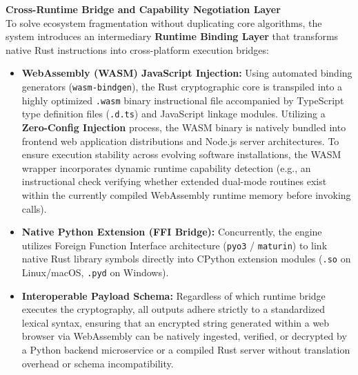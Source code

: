 \documentclass[12pt, a4paper]{article}
\begin{document}
\vspace{0.5em}
\noindent \textbf{Cross-Runtime Bridge and Capability Negotiation Layer} \\
To solve ecosystem fragmentation without duplicating core algorithms, the system introduces an intermediary \textbf{Runtime Binding Layer} that transforms native Rust instructions into cross-platform execution bridges:
\begin{itemize}
    \item \textbf{WebAssembly (WASM) JavaScript Injection:} Using automated binding generators (\texttt{wasm-bindgen}), the Rust cryptographic core is transpiled into a highly optimized \texttt{.wasm} binary instructional file accompanied by TypeScript type definition files (\texttt{.d.ts}) and JavaScript linkage modules. Utilizing a \textbf{Zero-Config Injection} process, the WASM binary is natively bundled into frontend web application distributions and Node.js server architectures. To ensure execution stability across evolving software installations, the WASM wrapper incorporates dynamic runtime capability detection (e.g., an instructional check verifying whether extended dual-mode routines exist within the currently compiled WebAssembly runtime memory before invoking calls).
    \item \textbf{Native Python Extension (FFI Bridge):} Concurrently, the engine utilizes Foreign Function Interface architecture (\texttt{pyo3} / \texttt{maturin}) to link native Rust library symbols directly into CPython extension modules (\texttt{.so} on Linux/macOS, \texttt{.pyd} on Windows).
    \item \textbf{Interoperable Payload Schema:} Regardless of which runtime bridge executes the cryptography, all outputs adhere strictly to a standardized lexical syntax, ensuring that an encrypted string generated within a web browser via WebAssembly can be natively ingested, verified, or decrypted by a Python backend microservice or a compiled Rust server without translation overhead or schema incompatibility.
\end{itemize}
\end{document}
